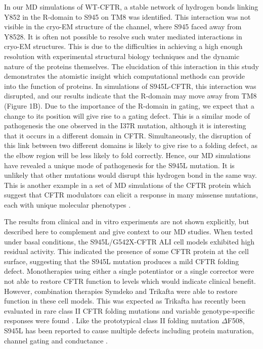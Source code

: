In our MD simulations of WT-CFTR, a stable network of hydrogen bonds linking Y852 in the R-domain to S945 on TM8 was identified. This interaction was not visible in the cryo-EM structure of the channel, where S945 faced away from Y8528. It is often not possible to resolve such water mediated interactions in cryo-EM structures. This is due to the difficulties in achieving a high enough resolution with experimental structural biology techniques and the dynamic nature of the proteins themselves. The elucidation of this interaction in this study demonstrates the atomistic insight which computational methods can provide into the function of proteins. In simulations of S945L-CFTR, this interaction was disrupted, and our results indicate that the R-domain may move away from TM8 (Figure 1B). Due to the importance of the R-domain in gating, we expect that a change to its position will give rise to a gating defect. This is a similar mode of pathogenesis the one observed in the I37R mutation, although it is interesting that it occurs in a different domain in CFTR. Simultaneously, the disruption of this link between two different domains is likely to give rise to a folding defect, as the elbow region will be less likely to fold correctly. Hence, our MD simulations have revealed a unique mode of pathogenesis for the S945L mutation. It is unlikely that other mutations would disrupt this hydrogen bond in the same way. This is another example in a set of MD simulations of the CFTR protein which suggest that CFTR modulators can elicit a response in many missense mutations, each with unique molecular phenotypes \cite{wong2022,wong2022a,billet2020,sabusap2021}. 

The results from clinical and in vitro experiments are not shown explicitly, but described here to complement and give context to our MD studies. When tested under basal conditions, the S945L/G542X-CFTR ALI cell models exhibited high residual activity. This indicated the presence of some CFTR protein at the cell surface, suggesting that the S945L mutation produces a mild CFTR folding defect. Monotherapies using either a single potentiator or a single corrector were not able to restore CFTR function to levels which would indicate clinical benefit. However, combination therapies Symdeko and Trikafta were able to restore function in these cell models. This was expected as Trikafta has recently been evaluated in rare class II CFTR folding mutations and variable genotype-specific responses were found \cite{veit2020, laselva2021}. Like the prototypical class II folding mutation $\Delta$F508, S945L has been reported to cause multiple defects including protein maturation, channel gating and conductance \cite{seibert1996}. 

